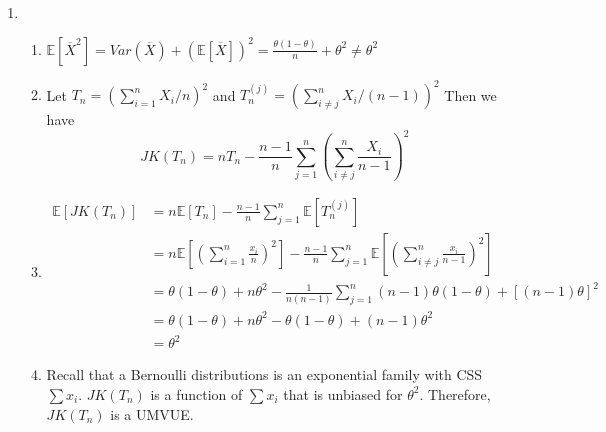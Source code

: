 \documentclass[12pt]{article}  %
\newcommand{\E}{{\mathbb{E}}}
\begin{document}
\begin{enumerate}
\begin{enumerate}
	\end{enumerate}

	\item 
	\begin{enumerate}
		\item $\E[\overline{X}^2] = Var(\overline{X}) + (\E[\overline{X}])^2 = \frac{\theta(1-\theta)}{n} + \theta^2\neq \theta^2$
		\item Let $T_n = \left(\sum_{i=1}^{n}X_i/n\right)^2$ and $T_{n}^{(j)} = \left(\sum_{i\neq j}^{n}X_i/(n-1)\right)^2$ Then we have $$JK(T_n) = nT_n  - \frac{n-1}{n}\sum_{j=1}^{n}\left(\sum_{i\neq j}^{n}\frac{X_i}{n-1}\right)^2$$
		\item 
		\begin{align*}
		\E[JK(T_n)] &= n\E[T_n]-\frac{n-1}{n}\sum_{j=1}^{n}\E[T_n^{(j)}]\\
		&= n\E\left[\left(\sum_{i=1}^{n}\frac{x_i}{n}\right)^2\right] - \frac{n-1}{n}\sum_{j=1}^{n}\E\left[\left(\sum_{i\neq j}^{n}\frac{x_i}{n-1}\right)^2\right]\\
		&=\theta(1-\theta) +n\theta^2 - \frac{1}{n(n-1)}\sum_{j=1}^{n}(n-1)\theta(1-\theta)+ [(n-1)\theta]^2\\
		&= \theta(1-\theta) +n\theta^2 -\theta(1-\theta) + (n-1)\theta^2\\
		&= \theta^2
		\end{align*}
		\item Recall that a Bernoulli distributions is an exponential family with CSS $\sum x_i$. $JK(T_n)$ is a function of $\sum x_i$ that is unbiased for $\theta^2$. Therefore, $JK(T_n)$ is a UMVUE. 
	\end{enumerate}

\end{enumerate}	
\end{document}
